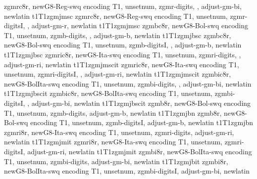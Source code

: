 {zgmrc8r,%
newG8-Reg-swq encoding T1,%
unsetnum,%
zgmr-digits,%
\metrics {}  ,%
adjust-gm-bi,%
newlatin}
{t1}{T1}{zgmj}{m}{sc}{}
%
{zgmrc8r,%
newG8-Reg-swq encoding T1,%
unsetnum,%
zgmr-digitsI,%
\metrics {}  ,%
adjust-gm-r,%
newlatin}
{t1}{T1}{zgmj}{m}{sc}{}
%
{zgmbc8r,%
newG8-Bol-swq encoding T1,%
unsetnum,%
zgmb-digits,%
\metrics {}  ,%
adjust-gm-b,%
newlatin}
{t1}{T1}{zgmj}{b}{sc}{}
%
{zgmbc8r,%
newG8-Bol-swq encoding T1,%
unsetnum,%
zgmb-digitsI,%
\metrics {}  ,%
adjust-gm-b,%
newlatin}
{t1}{T1}{zgmj}{b}{sc}{}
%
{zgmric8r,%
newG8-Ita-swq encoding T1,%
unsetnum,%
zgmri-digits,%
\metrics {}  ,%
adjust-gm-ri,%
newlatin}
{t1}{T1}{zgmj}{m}{scit}{}
%
{zgmric8r,%
newG8-Ita-swq encoding T1,%
unsetnum,%
zgmri-digitsI,%
\metrics {}  ,%
adjust-gm-ri,%
newlatin}
{t1}{T1}{zgmj}{m}{scit}{}
%
{zgmbic8r,%
newG8-BolIta-swq encoding T1,%
unsetnum,%
zgmbi-digits,%
\metrics {}  ,%
adjust-gm-bi,%
newlatin}
{t1}{T1}{zgmj}{b}{scit}{}
%
{zgmbic8r,%
newG8-BolIta-swq encoding T1,%
unsetnum,%
zgmbi-digitsI,%
\metrics {}  ,%
adjust-gm-bi,%
newlatin}
{t1}{T1}{zgmj}{b}{scit}{}
%
{zgmb8r,%
newG8-Bol-swq encoding T1,%
unsetnum,%
zgmb-digits,%
adjust-gm-b,%
newlatin}
{t1}{T1}{zgmj}{b}{n}{}
%
{zgmb8r,%
newG8-Bol-swq encoding T1,%
unsetnum,%
zgmb-digitsI,%
adjust-gm-b,%
newlatin}
{t1}{T1}{zgmj}{b}{n}{}
%
{zgmri8r,%
newG8-Ita-swq encoding T1,%
unsetnum,%
zgmri-digits,%
adjust-gm-ri,%
newlatin}
{t1}{T1}{zgmj}{m}{it}{}
%
{zgmri8r,%
newG8-Ita-swq encoding T1,%
unsetnum,%
zgmri-digitsI,%
adjust-gm-ri,%
newlatin}
{t1}{T1}{zgmj}{m}{it}{}
%
{zgmbi8r,%
newG8-BolIta-swq encoding T1,%
unsetnum,%
zgmbi-digits,%
adjust-gm-bi,%
newlatin}
{t1}{T1}{zgmj}{b}{it}{}
%
{zgmbi8r,%
newG8-BolIta-swq encoding T1,%
unsetnum,%
zgmbi-digitsI,%
adjust-gm-bi,%
newlatin}
